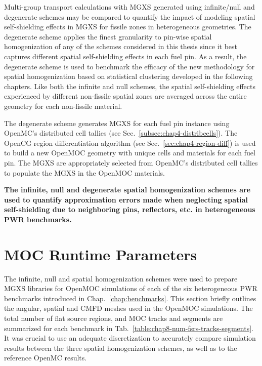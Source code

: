 Multi-group transport calculations with \ac{MGXS} generated using infinite/null and degenerate schemes may be compared to quantify the impact of modeling spatial self-shielding effects in \ac{MGXS} for fissile zones in heterogeneous geometries. The degenerate scheme applies the finest granularity to pin-wise spatial homogenization of any of the schemes considered in this thesis since it best captures different spatial self-shielding effects in each fuel pin. As a result, the degenerate scheme is used to benchmark the efficacy of the new methodology for spatial homogenization based on statistical clustering developed in the following chapters. Like both the infinite and null schemes, the spatial self-shielding effects experienced by different non-fissile spatial zones are averaged across the entire geometry for each non-fissile material.

The degenerate scheme generates \ac{MGXS} for each fuel pin instance using OpenMC's distributed cell tallies (see Sec.~\ref{subsec:chap4-distribcells}). The OpenCG region differentiation algorithm (see Sec.~\ref{sec:chap4-region-diff}) is used to build a new OpenMOC geometry with unique cells and materials for each fuel pin. The \ac{MGXS} are appropriately selected from OpenMC's distributed cell tallies to populate the \ac{MGXS} in the OpenMOC materials.

\begin{emphbox}
\textbf{The infinite, null and degenerate spatial homogenization schemes are used to quantify approximation errors made when neglecting spatial self-shielding due to neighboring pins, reflectors, etc. in heterogeneous \ac{PWR} benchmarks.}
\end{emphbox}


\section{\ac{MOC} Runtime Parameters}
\label{sec:chap8-moc-params}

The infinite, null and spatial homogenization schemes were used to prepare \ac{MGXS} libraries for OpenMOC simulations of each of the six heterogeneous \ac{PWR} benchmarks introduced in Chap.~\ref{chap:benchmarks}. This section briefly outlines the angular, spatial and \ac{CMFD} meshes used in the OpenMOC simulations. The total number of flat source regions, and \ac{MOC} tracks and segments are summarized for each benchmark in Tab.~\ref{table:chap8-num-fsrs-tracks-segments}. It was crucial to use an adequate discretization to accurately compare simulation results between the three spatial homogenization schemes, as well as to the reference OpenMC results.

